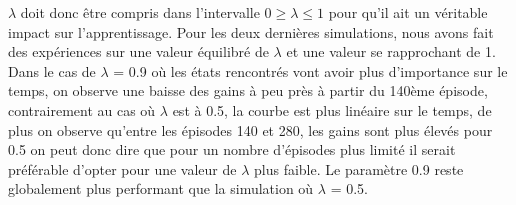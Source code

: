 \documentclass[letterpaper,11pt]{article}
\begin{document}
\begin{enumerate}[label=(\alph*)]
$\lambda$ doit donc être compris dans l'intervalle $0 \geq \lambda \leq 1$ pour qu'il ait un véritable impact sur l'apprentissage.
Pour les deux dernières simulations, nous avons fait des expériences sur une valeur équilibré de $\lambda$ et une valeur se rapprochant de 1.
Dans le cas de $\lambda$ = 0.9 où les états rencontrés vont avoir plus d'importance sur le temps, on observe une baisse des gains à peu près à partir du 140ème épisode, contrairement au cas où $\lambda$ est à 0.5, la courbe est plus linéaire sur le temps, de plus on observe qu'entre les épisodes 140 et 280, les gains sont plus élevés pour 0.5 on peut donc dire que pour un nombre d'épisodes plus limité il serait préférable d'opter pour une valeur de $\lambda$ plus faible.
Le paramètre 0.9 reste globalement plus performant que la simulation où $\lambda$ = 0.5.

\end{enumerate}
\end{document}

